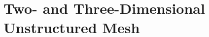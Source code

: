 \documentclass{turgon}
\begin{document}
\chapter{Two- and Three-Dimensional Unstructured Mesh}
\label{c:ustm}

\clearpage
{}


\end{document}
